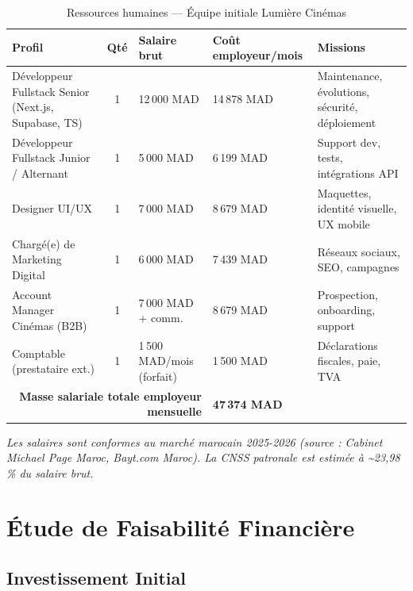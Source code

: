 \documentclass[12pt,a4paper,openany]{report}
\begin{document}
\begin{table}[H]
\centering
\footnotesize
\begin{tabular}{p{4.2cm}cp{2.8cm}p{3cm}p{3.5cm}}
\toprule
\textbf{Profil} & \textbf{Qté} & \textbf{Salaire brut} & \textbf{Coût employeur/mois} & \textbf{Missions} \\
\midrule
Développeur Fullstack Senior (Next.js, Supabase, TS) & 1 & 12\,000 MAD & 14\,878 MAD & Maintenance, évolutions, sécurité, déploiement \\
Développeur Fullstack Junior / Alternant & 1 & 5\,000 MAD & 6\,199 MAD & Support dev, tests, intégrations API \\
Designer UI/UX & 1 & 7\,000 MAD & 8\,679 MAD & Maquettes, identité visuelle, UX mobile \\
Chargé(e) de Marketing Digital & 1 & 6\,000 MAD & 7\,439 MAD & Réseaux sociaux, SEO, campagnes \\
Account Manager Cinémas (B2B) & 1 & 7\,000 MAD + comm. & 8\,679 MAD & Prospection, onboarding, support \\
Comptable (prestataire ext.) & 1 & 1\,500 MAD/mois (forfait) & 1\,500 MAD & Déclarations fiscales, paie, TVA \\
\midrule
\multicolumn{3}{r}{\textbf{Masse salariale totale employeur mensuelle}} & \multicolumn{2}{l}{\textbf{47\,374 MAD}} \\
\bottomrule
\end{tabular}
\caption{Ressources humaines — Équipe initiale Lumière Cinémas}
\label{tab:rh}
\end{table}

\noindent\textit{Les salaires sont conformes au marché marocain 2025-2026 (source : Cabinet Michael Page Maroc, Bayt.com Maroc). La CNSS patronale est estimée à \textasciitilde{}23,98\,\% du salaire brut.}

\section{Étude de Faisabilité Financière}

\subsection{Investissement Initial}
\end{document}
